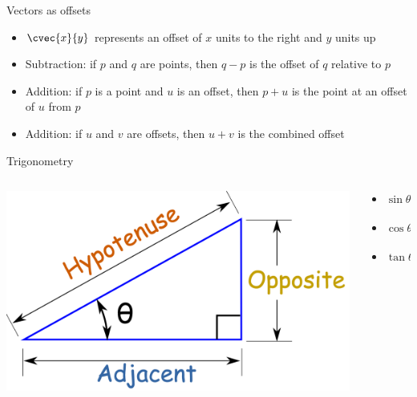 \begin{frame}{Vectors as offsets}
    \begin{itemize}
        \pause\item $\cvec{x}{y}$ represents an offset of $x$ units to the right and $y$ units up
        \pause\item Subtraction: if $p$ and $q$ are points, then $q-p$ is the offset of $q$ relative to $p$
        \pause\item Addition: if $p$ is a point and $u$ is an offset, then $p+u$ is the point at an offset of $u$ from $p$
        \pause\item Addition: if $u$ and $v$ are offsets, then $u+v$ is the combined offset
    \end{itemize}
\end{frame}

\begin{frame}{Trigonometry}
	\begin{columns}
		\begin{column}{0.48\textwidth}
			\includegraphics[width=\textwidth]{right_triangle}
		\end{column}
		\begin{column}{0.48\textwidth}
		    \begin{itemize}
		        \pause\item $\operatorname{sin} \theta = \frac{\operatorname{opposite}}{\operatorname{hypotenuse}}$
		        \pause\item $\operatorname{cos} \theta = \frac{\operatorname{adjacent}}{\operatorname{hypotenuse}}$
		        \pause\item $\operatorname{tan} \theta = \frac{\operatorname{opposite}}{\operatorname{adjacent}}$
		    \end{itemize}
		\end{column}
	\end{columns}
\end{frame}


